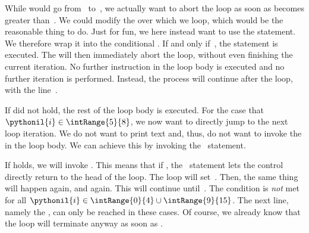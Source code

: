 While  would go from~ to~, we actually want to abort the loop as soon as  becomes greater than~.
We could modify the  over which we loop, which would be the reasonable thing to do.
Just for fun, we here instead want to use the  statement.
We therefore wrap it into the conditional .
If and only if~, the  statement is executed.
The  will then immediately abort the loop, without even finishing the current iteration.
No further instruction in the loop body is executed and no further iteration is performed.
Instead, the process will continue after the loop, with the line~.

If  did not hold, the rest of the loop body is executed.
For the case that $\pythonil{i}\in\intRange{5}{8}$, we now want to directly jump to the next loop iteration.
We do not want to print text and, thus, do not want to invoke the  in the loop body.
We can achieve this by invoking the ~statement.

If  holds, we will invoke .
This means that if , the ~statement lets the control directly return to the head of the loop.
The loop will set~.
Then, the same thing will happen again, and again.
This will continue until~.
The condition  is \emph{not} met for all $\pythonil{i}\in\intRange{0}{4}\cup\intRange{9}{15}$.
The next line, namely the , can only be reached in these cases.
Of course, we already know that the loop will terminate anyway as soon as .

